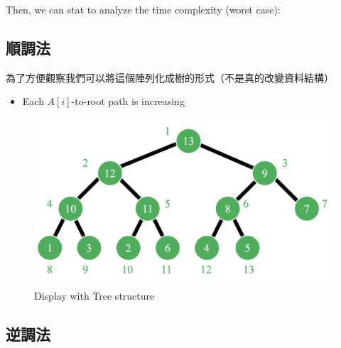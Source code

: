 \vspace{0.5em}

Then, we can stat to analyze the time complexity (worst case):



\newpage

\subsection{順調法}

\begin{definition}[順調法]
    
\end{definition}

為了方便觀察我們可以將這個陣列化成樹的形式（不是真的改變資料結構）
\begin{itemize}
    \item Each $A[i]$-to-root path is increasing
\end{itemize}

\begin{figure}[h]
    \centering
    \includegraphics[width=0.55 \linewidth]{Figures/tree.png}
    \caption{Display with Tree structure}
\end{figure}

\subsection{逆調法}

\newpage
{}
\newpage